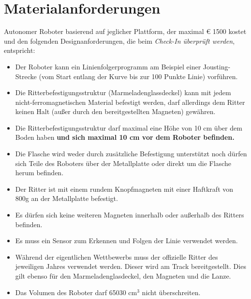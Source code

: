 \documentclass[a4paper,12pt]{article}
\begin{document}
\section{Materialanforderungen}
Autonomer Roboter basierend auf jeglicher Plattform, der maximal  \euro{ 1500} kostet und den folgenden
Designanforderungen, die beim \emph{Check-In überprüft werden}, entspricht:
\begin{itemize}
\item Der Roboter kann ein Linienfolgerprogramm am Beispiel einer Jousting-Strecke (vom Start entlang der Kurve
bis zur 100 Punkte Linie) vorführen.
\item Die Ritterbefestigungsstruktur (Marmeladenglassdeckel) kann mit jedem nicht-ferromagnetischen Material
befestigt werden, darf allerdings dem Ritter keinen Halt (außer durch den bereitgestellten Magneten)
gewähren.
\item Die Ritterbefestigungsstruktur darf maximal eine Höhe von 10 cm über dem Boden haben \textbf{und sich maximal 10 cm vor dem Roboter befinden.}
\item Die Flasche wird weder durch zusätzliche Befestigung unterstützt noch dürfen sich Teile des Roboters über der Metallplatte oder direkt um die Flasche herum befinden.
\item Der Ritter ist mit einem rundem Knopfmagneten mit einer Haftkraft von 800g an der Metallplatte befestigt.
\item Es dürfen sich keine weiteren Magneten innerhalb oder außerhalb des Ritters befinden.
\item Es muss ein Sensor zum Erkennen und Folgen der Linie verwendet werden.
\item Während der eigentlichen Wettbewerbs muss der offizielle Ritter des jeweiligen Jahres verwendet werden.
Dieser wird am Track bereitgestellt. Dies gilt ebenso für den Marmeladenglasdeckel, den Magneten und die
Lanze.
\item Das Volumen des Roboter darf 65030 cm$^{3}$ nicht überschreiten.
\end{itemize}
\end{document}
